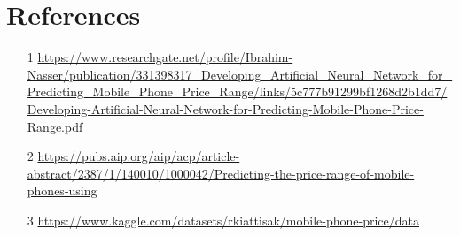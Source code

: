 \documentclass{article}
\begin{document}
\section*{References}
\begin{itemize}
    \item [1] \url{https://www.researchgate.net/profile/Ibrahim-Nasser/publication/331398317_Developing_Artificial_Neural_Network_for_Predicting_Mobile_Phone_Price_Range/links/5c777b91299bf1268d2b1dd7/Developing-Artificial-Neural-Network-for-Predicting-Mobile-Phone-Price-Range.pdf}
    \item [2] \url{https://pubs.aip.org/aip/acp/article-abstract/2387/1/140010/1000042/Predicting-the-price-range-of-mobile-phones-using}
    \item [3] \url{https://www.kaggle.com/datasets/rkiattisak/mobile-phone-price/data}
\end{itemize}
\end{document}

